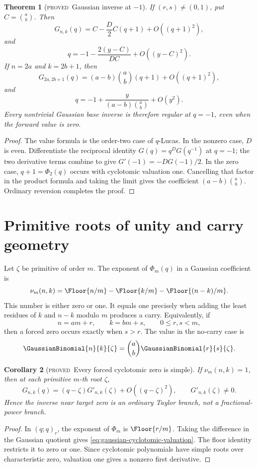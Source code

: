 \documentclass[11pt,letterpaper,oneside,openany]{book}
\newtheorem{theorem}{Theorem}[chapter]
\newtheorem{corollary}[theorem]{Corollary}
\theoremstyle{definition}
\theoremstyle{remark}
\newcommand{\statusproved}{\textcolor{provedgreen}{\textsc{proved}}}
\begin{document}
\begin{theorem}[\statusproved\ Gaussian inverse at \(-1\)]
If \((r,s)\ne(0,1)\), put \(C=\binom ab\).  Then
\begin{equation}\label{eq:gaussian-minus-one-nonzero}
 G_{n,k}(q)=C-\frac{D}{2}C(q+1)+O((q+1)^2),
\end{equation}
and
\[
 q=-1-\frac{2(y-C)}{DC}+O((y-C)^2).
\]
If \(n=2a\) and \(k=2b+1\), then
\begin{equation}\label{eq:gaussian-minus-one-zero}
 G_{2a,2b+1}(q)
 =(a-b)\binom ab(q+1)+O((q+1)^2),
\end{equation}
and
\[
 q=-1+\frac{y}{(a-b)\binom ab}+O(y^2).
\]
Every nontrivial Gaussian base inverse is therefore regular at \(q=-1\), even
when the forward value is zero.
\end{theorem}
\begin{proof}
The value formula is the order-two case of \(q\)-Lucas.  In the nonzero case,
\(D\) is even.  Differentiate the reciprocal identity
\(G(q)=q^DG(q^{-1})\) at \(q=-1\); the two derivative terms combine to give
\(G'(-1)=-DG(-1)/2\).  In the zero case, \(q+1=\Phi_2(q)\) occurs with
cyclotomic valuation one.  Cancelling that factor in the product formula and
taking the limit gives the coefficient
\((a-b)\binom ab\).  Ordinary reversion completes the proof.
\end{proof}

\section{Primitive roots of unity and carry geometry}
Let \(\zeta\) be primitive of order \(m\).  The exponent of \(\Phi_m(q)\) in a
Gaussian coefficient is
\begin{equation}\label{eq:gaussian-cyclotomic-valuation}
 \nu_m(n,k)=\Floor{n/m}-\Floor{k/m}-\Floor{(n-k)/m}.
\end{equation}
This number is either zero or one.  It equals one precisely when adding the
least residues of \(k\) and \(n-k\) modulo \(m\) produces a carry.  Equivalently,
if
\[
 n=am+r,
 \qquad k=bm+s,
 \qquad 0\le r,s<m,
\]
then a forced zero occurs exactly when \(s>r\).  The value in the no-carry case
is
\[
 \GaussianBinomial{n}{k}{\zeta}=\binom ab\GaussianBinomial{r}{s}{\zeta}.
\]

\begin{corollary}[\statusproved\ Every forced cyclotomic zero is simple]
If \(\nu_m(n,k)=1\), then at each primitive \(m\)-th root \(\zeta\),
\[
 G_{n,k}(q)=(q-\zeta)G'_{n,k}(\zeta)+O((q-\zeta)^2),
 \qquad G'_{n,k}(\zeta)\ne0.
\]
Hence the inverse near target zero is an ordinary Taylor branch, not a
fractional-power branch.
\end{corollary}
\begin{proof}
In \((q;q)_r\), the exponent of \(\Phi_m\) is \(\Floor{r/m}\).  Taking the
difference in the Gaussian quotient gives \eqref{eq:gaussian-cyclotomic-valuation}.
The floor identity restricts it to zero or one.  Since cyclotomic polynomials
have simple roots over characteristic zero, valuation one gives a nonzero
first derivative.
\end{proof}
\end{document}
